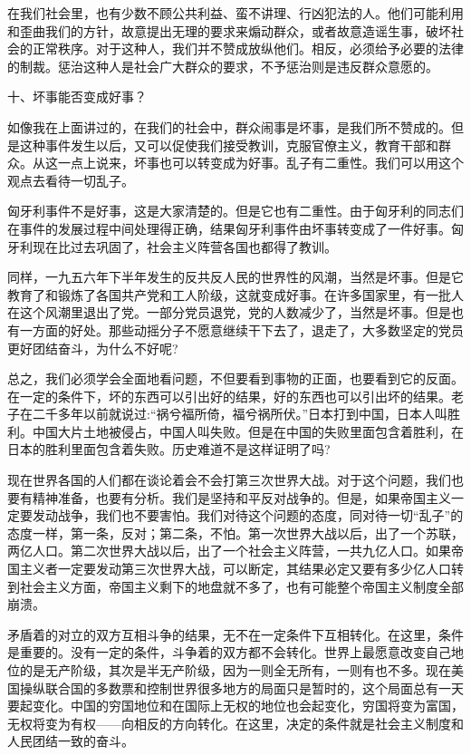 \documentclass[UTF8, 12pt, a4paper]{ctexrep}
\begin{document}
在我们社会里，也有少数不顾公共利益、蛮不讲理、行凶犯法的人。他们可能利用和歪曲我们的方针，故意提出无理的要求来煽动群众，或者故意造谣生事，破坏社会的正常秩序。对于这种人，我们并不赞成放纵他们。相反，必须给予必要的法律的制裁。惩治这种人是社会广大群众的要求，不予惩治则是违反群众意愿的。

十、坏事能否变成好事？

如像我在上面讲过的，在我们的社会中，群众闹事是坏事，是我们所不赞成的。但是这种事件发生以后，又可以促使我们接受教训，克服官僚主义，教育干部和群众。从这一点上说来，坏事也可以转变成为好事。乱子有二重性。我们可以用这个观点去看待一切乱子。

匈牙利事件不是好事，这是大家清楚的。但是它也有二重性。由于匈牙利的同志们在事件的发展过程中间处理得正确，结果匈牙利事件由坏事转变成了一件好事。匈牙利现在比过去巩固了，社会主义阵营各国也都得了教训。

同样，一九五六年下半年发生的反共反人民的世界性的风潮，当然是坏事。但是它教育了和锻炼了各国共产党和工人阶级，这就变成好事。在许多国家里，有一批人在这个风潮里退出了党。一部分党员退党，党的人数减少了，当然是坏事。但是也有一方面的好处。那些动摇分子不愿意继续干下去了，退走了，大多数坚定的党员更好团结奋斗，为什么不好呢?

总之，我们必须学会全面地看问题，不但要看到事物的正面，也要看到它的反面。在一定的条件下，坏的东西可以引出好的结果，好的东西也可以引出坏的结果。老子在二千多年以前就说过:“祸兮福所倚，福兮祸所伏。”日本打到中国，日本人叫胜利。中国大片土地被侵占，中国人叫失败。但是在中国的失败里面包含着胜利，在日本的胜利里面包含着失败。历史难道不是这样证明了吗?

现在世界各国的人们都在谈论着会不会打第三次世界大战。对于这个问题，我们也要有精神准备，也要有分析。我们是坚持和平反对战争的。但是，如果帝国主义一定要发动战争，我们也不要害怕。我们对待这个问题的态度，同对待一切“乱子”的态度一样，第一条，反对；第二条，不怕。第一次世界大战以后，出了一个苏联，两亿人口。第二次世界大战以后，出了一个社会主义阵营，一共九亿人口。如果帝国主义者一定要发动第三次世界大战，可以断定，其结果必定又要有多少亿人口转到社会主义方面，帝国主义剩下的地盘就不多了，也有可能整个帝国主义制度全部崩溃。

矛盾着的对立的双方互相斗争的结果，无不在一定条件下互相转化。在这里，条件是重要的。没有一定的条件，斗争着的双方都不会转化。世界上最愿意改变自己地位的是无产阶级，其次是半无产阶级，因为一则全无所有，一则有也不多。现在美国操纵联合国的多数票和控制世界很多地方的局面只是暂时的，这个局面总有一天要起变化。中国的穷国地位和在国际上无权的地位也会起变化，穷国将变为富国，无权将变为有权——向相反的方向转化。在这里，决定的条件就是社会主义制度和人民团结一致的奋斗。
\end{document}
